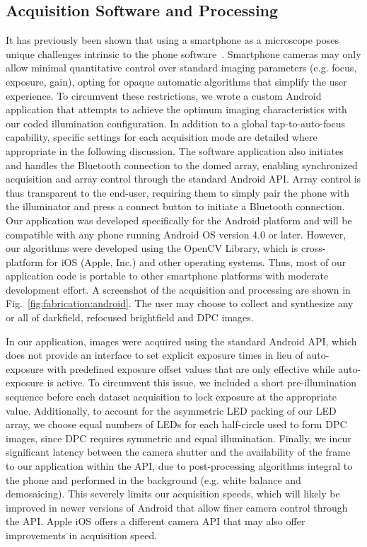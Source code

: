 \subsection{Acquisition Software and Processing}
It has previously been shown that using a smartphone as a microscope poses unique challenges intrinsic to the phone software~\cite{skandarajah2014quantitative}. Smartphone cameras may only allow minimal quantitative control over standard imaging parameters (e.g. focus, exposure, gain), opting for opaque automatic algorithms that simplify the user experience. To circumvent these restrictions, we wrote a custom Android application that attempts to achieve the optimum imaging characteristics with our coded illumination configuration. In addition to a global tap-to-auto-focus capability, specific settings for each acquisition mode are detailed where appropriate in the following discussion. The software application also initiates and handles the Bluetooth connection to the domed array, enabling synchronized acquisition and array control through the standard Android API. Array control is thus transparent to the end-user, requiring them to simply pair the phone with the illuminator and press a connect button to initiate a Bluetooth connection. Our application was developed specifically for the Android platform and will be compatible with any phone running Android OS version 4.0 or later. However, our algorithms were developed using the OpenCV Library, which is cross-platform for iOS (Apple, Inc.) and other operating systems. Thus, most of our application code is portable to other smartphone platforms with moderate development effort. A screenshot of the acquisition and processing are shown in Fig.~\ref{fig:fabrication:android}. The user may choose to collect and synthesize any or all of darkfield, refocused brightfield and DPC images.

In our application, images were acquired using the standard Android API, which does not provide an interface to set explicit exposure times in lieu of auto-exposure with predefined exposure offset values that are only effective while auto-exposure is active. To circumvent this issue, we included a short pre-illumination sequence before each dataset acquisition to lock exposure at the appropriate value. Additionally, to account for the asymmetric LED packing of our LED array, we choose equal numbers of LEDs for each half-circle used to form DPC images, since DPC requires symmetric and equal illumination. Finally, we incur significant latency between the camera shutter and the availability of the frame to our application within the API, due to post-processing algorithms integral to the phone and performed in the background (e.g. white balance and demosaicing). This severely limits our acquisition speeds, which will likely be improved in newer versions of Android that allow finer camera control through the API. Apple iOS offers a different camera API that may also offer improvements in acquisition speed.

